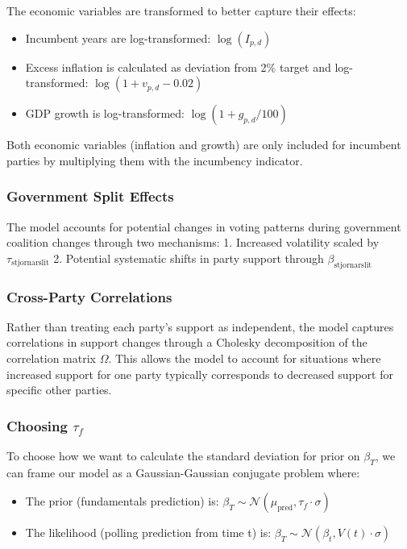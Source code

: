 \documentclass[
  letterpaper,
  DIV=11,
  numbers=noendperiod]{scrartcl}
\providecommand{\tightlist}{%
  \setlength{\itemsep}{0pt}\setlength{\parskip}{0pt}}\usepackage{longtable,booktabs,array}
\begin{document}
The economic variables are transformed to better capture their effects:

\begin{itemize}
\tightlist
\item
  Incumbent years are log-transformed: \(\log(I_{p,d})\)
\item
  Excess inflation is calculated as deviation from 2\% target and
  log-transformed: \(\log(1 + v_{p,d} - 0.02)\)
\item
  GDP growth is log-transformed: \(\log(1 + g_{p,d}/100)\)
\end{itemize}

Both economic variables (inflation and growth) are only included for
incumbent parties by multiplying them with the incumbency indicator.

\subsubsection{Government Split Effects}\label{government-split-effects}

The model accounts for potential changes in voting patterns during
government coalition changes through two mechanisms: 1. Increased
volatility scaled by \(\tau_\text{stjornarslit}\) 2. Potential
systematic shifts in party support through \(\beta_\text{stjornarslit}\)

\subsubsection{Cross-Party
Correlations}\label{cross-party-correlations-1}

Rather than treating each party's support as independent, the model
captures correlations in support changes through a Cholesky
decomposition of the correlation matrix \(\Omega\). This allows the
model to account for situations where increased support for one party
typically corresponds to decreased support for specific other parties.

\subsubsection{\texorpdfstring{Choosing
\(\tau_f\)}{Choosing \textbackslash tau\_f}}\label{choosing-tau_f}

To choose how we want to calculate the standard deviation for prior on
\(\beta_T\), we can frame our model as a Gaussian-Gaussian conjugate
problem where:

\begin{itemize}
\tightlist
\item
  The prior (fundamentals prediction) is:
  \(\beta_T \sim \mathcal{N}(\mu_{\text{pred}}, \tau_f \cdot \sigma)\)
\item
  The likelihood (polling prediction from time t) is:
  \(\beta_T \sim \mathcal{N}(\beta_t, V(t) \cdot \sigma)\)
\end{itemize}
\end{document}
